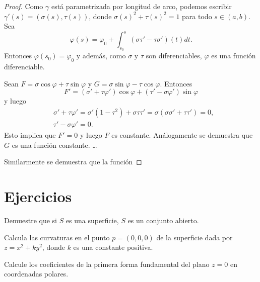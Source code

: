 \begin{proof}
	Como $\gamma$ está parametrizada por longitud de arco, podemos escribir 
	$\gamma'(s)=(\sigma(s),\tau(s))$, donde $\sigma(s)^2+\tau(s)^2=1$ para todo $s\in(a,b)$. Sea
	\[
		\varphi(s)=\varphi_0+\int_{s_0}^s(\sigma\tau'-\tau\sigma')(t)dt.
	\]
	Entonces $\varphi(s_0)=\varphi_0$ y además, como $\sigma$ y $\tau$ son
	diferenciables, $\varphi$ es una función diferenciable. 

	Sean $F=\sigma\cos\varphi+\tau\sin\varphi$ y 
	$G=\sigma\sin\varphi-\tau\cos\varphi$. 
	Entonces 
	\[
		F'=(\sigma'+\tau\varphi')\cos\varphi+(\tau'-\sigma\varphi')\sin\varphi
	\]
	y luego
	\begin{align*}
		&\sigma'+\tau\varphi'=\sigma'(1-\tau^2)+\sigma\tau\tau'=\sigma(\sigma\sigma'+\tau\tau')=0,\\
		&\tau'-\sigma\varphi'=0.
	\end{align*}
	Esto implica que $F'=0$ y luego $F$ es constante. Análogamente se demuestra que $G$ es una función constante.
	\dots

	
	Similarmente se demuestra que la función 
\end{proof}
\chapter{Ejercicios}

\begin{exercise}
	Demuestre que si $S$ es una superficie, $S$ es un conjunto abierto.
\end{exercise}

\begin{exercise}
	Calcula las curvaturas en el punto $p=(0,0,0)$ de la superficie dada por
	$z=x^2+ky^2$, donde $k$ es una constante positiva.
\end{exercise}

\begin{exercise}
	Calcule los coeficientes de la primera forma fundamental del plano $z=0$ en
	coordenadas polares.
\end{exercise}
	
